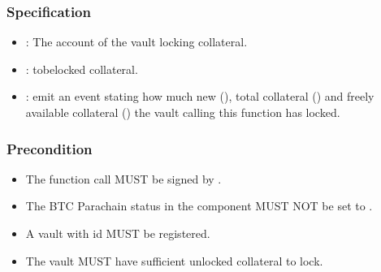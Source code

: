 \documentclass[a4paper,10pt,english]{sphinxmanual}
\begin{document}
\subsubsection{Specification}
\label{\detokenize{spec/vault-registry:id10}}


\begin{itemize}
\item {} 
: The account of the vault locking collateral.

\item {} 
: to\sphinxhyphen{}be\sphinxhyphen{}locked collateral.

\end{itemize}

\begin{itemize}
\item {} 
: emit an event stating how much new (), total collateral () and freely available collateral () the vault calling this function has locked.

\end{itemize}


\subsubsection{Precondition}
\label{\detokenize{spec/vault-registry:precondition}}\begin{itemize}
\item {} 
The function call MUST be signed by .

\item {} 
The BTC Parachain status in the {\hyperref[\detokenize{spec/security:security}]{}} component MUST NOT be set to .

\item {} 
A vault with id  MUST be registered.

\item {} 
The vault MUST have sufficient unlocked collateral to lock.

\end{itemize}
\end{document}
